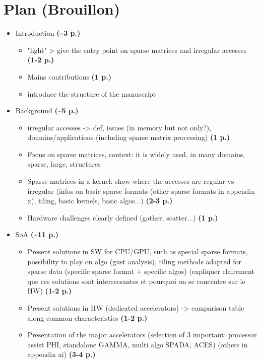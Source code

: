 \chapter*{Plan (Brouillon)}

\begin{itemize}
    \item Introduction \textbf{(\textasciitilde 3 p.)}
    \begin{itemize}
        \item "light" > give the entry point on sparse matrices and irregular accesses \textbf{(1-2 p.)}
        \item Mains contributions \textbf{(1 p.)}
        \item introduce the structure of the manuscript
    \end{itemize}
    \item Background \textbf{(\textasciitilde 5 p.)}
    \begin{itemize}
        \item irregular accesses -> def, issues (in memory but not only?), domains/applications (including sparse matrix processing) \textbf{(1 p.)}
        \item Focus on sparse matrices, context: it is widely used, in many domains, sparse, large, structures
        \item Sparse matrices in a kernel: show where the accesses are regular vs irregular (infos on basic sparse formats (other sparse formats in appendix x), tiling, basic kernels, basic algos...) \textbf{(2-3 p.)}
        \item Hardware challenges clearly defined (gather, scatter...) \textbf{(1 p.)}
    \end{itemize}
    \item SoA \textbf{(\textasciitilde 11 p.)}
    \begin{itemize}
        \item Present solutions in SW for CPU/GPU, such as special sparse formats, possibility to play on algo (gust analysis), tiling methods adapted for sparse data (specific sparse format + specific algos) (expliquer clairement que ces solutions sont interressantes et pourquoi on se concentre sur le HW) \textbf{(1-2 p.)}
        \item Present solutions in HW (dedicated accelerators) -> comparison table along common characteristics \textbf{(1-2 p.)}
        \item Presentation of the major accelerators (selection of 3 important: processor assist PHI, standalone GAMMA, multi algo SPADA, ACES) (others in appendix xi) \textbf{(3-4 p.)}

\end{itemize}
\end{itemize}
